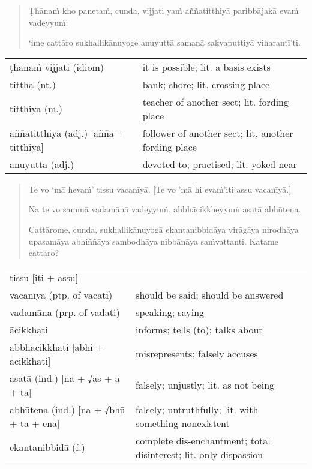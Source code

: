 \documentclass[11pt,oneside]{memoir}
\begin{document}
\begin{quote}
Ṭhānaṁ kho panetaṁ, cunda, vijjati yaṁ aññatitthiyā paribbājakā evaṁ vadeyyuṁ:

‘ime cattāro sukhallikānuyoge anuyuttā samaṇā sakyaputtiyā viharantī’ti.
\end{quote}

\begin{longtable}{L{\colOne} L{\colTwo}}
ṭhānaṁ vijjati (idiom) & it is possible; lit. a basis exists\\[0pt]
tittha (nt.) & bank; shore; lit. crossing place\\[0pt]
titthiya (m.) & teacher of another sect; lit. fording place\\[0pt]
aññatitthiya (adj.) [añña + titthiya] & follower of another sect; lit. another fording place\\[0pt]
anuyutta (adj.) & devoted to; practised; lit. yoked near\\[0pt]
\end{longtable}

\clearpage

\begin{quote}
Te vo ‘mā hevaṁ’ tissu vacanīyā. [Te vo 'mā hi evaṁ'iti assu vacanīyā.]

Na te vo sammā vadamānā vadeyyuṁ, abbhācikkheyyuṁ asatā abhūtena.

Cattārome, cunda, sukhallikānuyogā ekantanibbidāya virāgāya nirodhāya upasamāya
abhiññāya sambodhāya nibbānāya saṁvattanti. Katame cattāro?
\end{quote}

\begin{longtable}{L{\colOne} L{\colTwo}}
tissu [iti + assu] & \\[0pt]
vacanīya (ptp. of vacati) & should be said; should be answered\\[0pt]
vadamāna (prp. of vadati) & speaking; saying\\[0pt]
ācikkhati & informs; tells (to); talks about\\[0pt]
abbhācikkhati [abhi + ācikkhati] & misrepresents; falsely accuses\\[0pt]
asatā (ind.) [na + √as + a + tā] & falsely; unjustly; lit. as not being\\[0pt]
abhūtena (ind.) [na + √bhū + ta + ena] & falsely; untruthfully; lit. with something nonexistent\\[0pt]
ekantanibbidā (f.) & complete dis-enchantment; total disinterest; lit. only dispassion\\[0pt]
\end{longtable}
\end{document}
